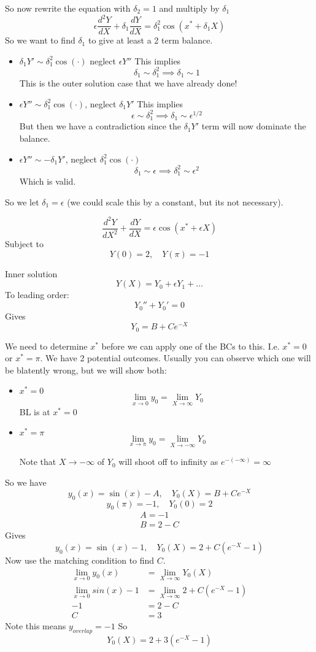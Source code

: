 \documentclass{/home/janmebows/Documents/LatexTemplates/myassignment}
\begin{document}
So now rewrite the equation with $\delta_2 = 1$ and multiply by $\delta_1$
\[\epsilon \frac{d^2 Y}{dX} + \delta_1 \frac{dY}{dX} = \delta_1^2\cos(x^* + \delta_1 X)\]
So we want to find $\delta_1$ to give at least a 2 term balance. 
\begin{itemize}
    \item $\delta_1 Y' \sim \delta_1^2 \cos(\cdot) $ neglect $\epsilon Y''$
    This implies
    \[\delta_1 \sim  \delta_1^2 \implies \delta_1 \sim 1\]
    This is the outer solution case that we have already done!
    \item $\epsilon Y'' \sim \delta_1^2 \cos(\cdot)$, neglect $\delta_1 Y'$
    This implies
    \[\epsilon \sim \delta_1^2 \implies \delta_1 \sim \epsilon^{1/2}\]
    But then we have a contradiction since the $\delta_1 Y'$ term will now dominate the balance.
    \item $\epsilon Y'' \sim -\delta_1 Y'$, neglect $\delta_1^2 \cos(\cdot)$
    \[\delta_1 \sim \epsilon \implies \delta_1^2 \sim \epsilon^2\]
    Which is valid.

\end{itemize}
So we let $\delta_1 = \epsilon$ (we could scale this by a constant, but its not necessary).

\[\frac{d^2Y}{dX^2} + \frac{dY}{dX} = \epsilon \cos(x^* + \epsilon X)\]
Subject to 
\[Y(0) = 2,\quad Y(\pi) = -1\]

Inner solution
\[Y(X) = Y_0 + \epsilon Y_1 + \ldots\]
To leading order:
\[Y_0'' + Y_0' = 0\]
Gives
\[Y_0 = B + Ce^{-X}\]

We need to determine $x^*$ before we can apply one of the BCs to this.
I.e. $x^* = 0$ or $x^* = \pi$. We have 2 potential outcomes. Usually you can observe which one will be blatently wrong, but we will show both:

\begin{itemize}
    \item $x^* = 0$
    \[\lim_{x\to 0} y_0 = \lim_{X\to \infty} Y_0\]
    BL is at $x^* =0$

    \item $x^* = \pi$
    \[\lim_{x\to \pi}y_0 = \lim_{X\to -\infty} Y_0\]

Note that $X \to -\infty$ of $Y_0$ will shoot off to infinity as $e^{-(-\infty)} =\infty$
\end{itemize}



So we have
\[y_0(x) =\sin(x) -A ,\quad Y_0(X) = B + Ce^{-X}\]
\[y_0(\pi) = -1, \quad Y_0(0) = 2\]
\begin{align*}
    A = -1\\
    B = 2-C
\end{align*}
Gives
\[y_0(x) = \sin(x) -1,\quad Y_0(X) = 2 + C(e^{-X}-1)\]
Now use the matching condition to find $C$.
\begin{align*}
    \lim_{x\to 0} y_0(x) &= \lim_{X\to\infty} Y_0(X)\\
    \lim_{x\to 0} sin(x) -1&= \lim_{X\to\infty} 2 + C(e^{-X}-1)\\
    -1&= 2 - C\\
    C &= 3
\end{align*}
Note this means $y_{overlap} = -1$
So 
\[Y_0(X) = 2 + 3(e^{-X} -1)\]
\end{document}
